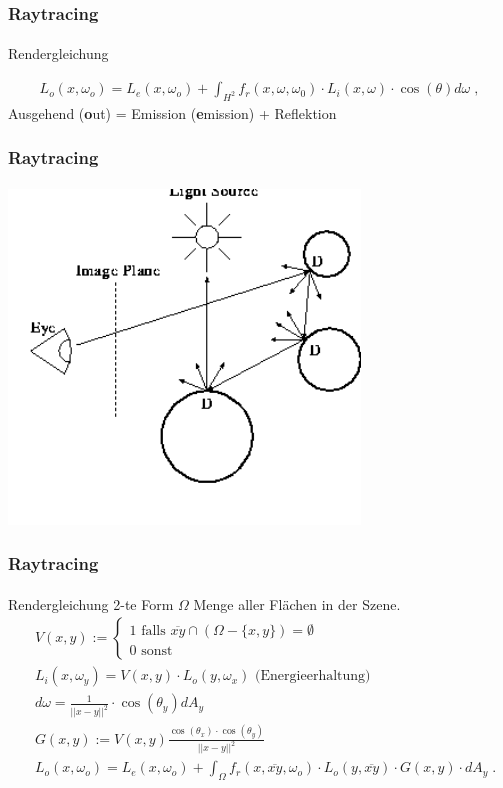 \documentclass{beamer}
\begin{document}
\begin{frame}
    \frametitle{Raytracing}
\framesubtitle{}
\begin{block}{Rendergleichung}

\begin{align}
L_o(x, \omega_o) = L_e(x, \omega_o)  + \displaystyle \int_{H^2}f_r (x, \omega, \omega_0) \cdot L_i(x, \omega)  \cdot  \cos(\theta) d\omega \; ,
\end{align}
Ausgehend (\textbf{o}ut) = Emission (\textbf{e}mission) + Reflektion
\end{block}
\end{frame}



\begin{frame}
    \frametitle{Raytracing}
\framesubtitle{}

  \begin{center}
    \includegraphics[width=0.7\textwidth]{images/rayTracing}
\end{center}

\end{frame}



\begin{frame}
    \frametitle{Raytracing}
\framesubtitle{}
\begin{block}{Rendergleichung 2-te Form}
 $\Omega$  Menge aller Flächen  in der Szene.
\begin{align*}
& V(x,y) := \begin{cases}
 1 \text{ falls } \overline{xy} \cap (\Omega -\{x,y\}) = \emptyset \\
0 \text{ sonst }
\end{cases} \\
& L_i(x, \omega_y) = V(x,y) \cdot L_o(y, \omega_x) \text{ (Energieerhaltung)} \\
& d\omega =  \frac{1}{||x -y||^2} \cdot  \cos(\theta_y) dA_y \\
& G(x,y) := V(x,y)  \frac{ \cos(\theta_x) \cdot  \cos(\theta_y)}{||x -y||^2} \\
& L_o(x, \omega_o) = L_e(x, \omega_o)  + \displaystyle \int_{\Omega} f_r (x, \overline{xy}, \omega_o) \cdot   L_o(y, \overline{xy})  \cdot  G(x,y) \cdot   dA_y \; .
\end{align*} 
\end{block}
\end{frame}
\end{document}
